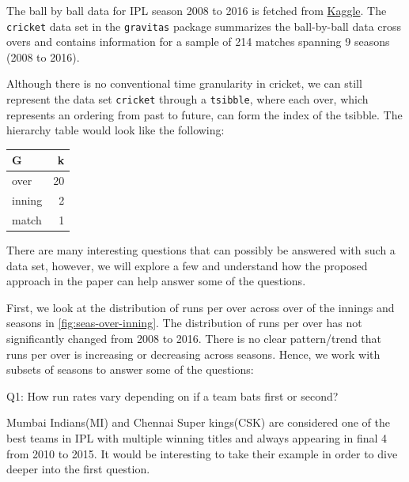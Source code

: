 \documentclass[12pt]{article}
\begin{document}
The ball by ball data for IPL season 2008 to 2016 is fetched from
\href{https://www.kaggle.com/josephgpinto/ipl-data-analysis/data}{Kaggle}.
The \texttt{cricket} data set in the \texttt{gravitas} package
summarizes the ball-by-ball data cross overs and contains information
for a sample of 214 matches spanning 9 seasons (2008 to 2016).

Although there is no conventional time granularity in cricket, we can
still represent the data set \texttt{cricket} through a
\texttt{tsibble}, where each over, which represents an ordering from
past to future, can form the index of the tsibble. The hierarchy table
would look like the following:

\begin{longtable}[]{@{}lr@{}}
\toprule
G & k\tabularnewline
\midrule
\endhead
over & 20\tabularnewline
inning & 2\tabularnewline
match & 1\tabularnewline
\bottomrule
\end{longtable}

There are many interesting questions that can possibly be answered with
such a data set, however, we will explore a few and understand how the
proposed approach in the paper can help answer some of the questions.

First, we look at the distribution of runs per over across over of the
innings and seasons in \autoref{fig:seas-over-inning}. The distribution
of runs per over has not significantly changed from 2008 to 2016. There
is no clear pattern/trend that runs per over is increasing or decreasing
across seasons. Hence, we work with subsets of seasons to answer some of
the questions:

Q1: How run rates vary depending on if a team bats first or second?

Mumbai Indians(MI) and Chennai Super kings(CSK) are considered one of
the best teams in IPL with multiple winning titles and always appearing
in final 4 from 2010 to 2015. It would be interesting to take their
example in order to dive deeper into the first question.
\end{document}
